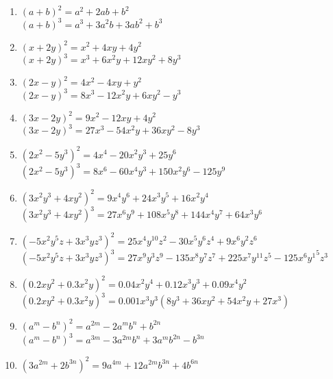 \begin{solution} \hfill \vspace{-0.5cm}
\begin{enumerate}
\item$(a+b)^2 = {{a}^{2}}+2ab+{{b}^{2}}$\\	$(a+b)^3 = {{a}^{3}}+3{{a}^{2}}b+3a{{b}^{2}}+{{b}^{3}}$
\item $(x+2y)^2 = {{x}^{2}}+4xy+4{{y}^{2}}$ \\	$(x+2y)^3 ={{x}^{3}}+6{{x}^{2}}y+12x{{y}^{2}}+8{{y}^{3}}$
\item $(2x-y)^2 = 4{{x}^{2}}-4xy+{{y}^{2}}$ \\	$(2x-y)^3 =8{{x}^{3}}-12x{}^{2}y+6x{{y}^{2}}-{{y}^{3}}$
\item $(3x-2y)^2 = 9{{x}^{2}}-12xy+4{{y}^{2}}$\\	$(3x-2y)^3 = 27{{x}^{3}}-54{{x}^{2}}y+36x{{y}^{2}}-8{{y}^{3}}$
\item $( 2{{x}^{2}}-5{{y}^{3}} ) ^2 = 4{{x}^{4}}-20{{x}^{2}}{{y}^{3}}+25{{y}^{6}}$\\	$( 2{{x}^{2}}-5{{y}^{3}} )^3 = 8{{x}^{6}}-60{{x}^{4}}{{y}^{3}}+150{{x}^{2}}{{y}^{6}}-125{{y}^{9}}$
\item $(3{{x}^{2}}{{y}^{3}}+4x{{y}^{2}})^2=9{{x}^{4}}{{y}^{6}}+24{{x}^{3}}{{y}^{5}}+16{{x}^{2}}{{y}^{4}}$\\
$(3{{x}^{2}}{{y}^{3}}+4x{{y}^{2}})^3=27{{x}^{6}}{{y}^{9}}+108{{x}^{5}}{{y}^{8}}+144{{x}^{4}}{{y}^{7}}+64{{x}^{3}}{{y}^{6}}$
\item $(-5{{x}^{2}}{{y}^{5}}z+3{{x}^{3}}y{{z}^{3}})^2=25{{x}^{4}}{{y}^{10}}{{z}^{2}}-30{{x}^{5}}{{y}^{6}}{{z}^{4}}+9{{x}^{6}}{{y}^{2}}{{z}^{6}}$\\					$(-5{{x}^{2}}{{y}^{5}}z+3{{x}^{3}}y{{z}^{3}})^3=27{{x}^{9}}{{y}^{3}}z{}^{9}-135{{x}^{8}}{{y}^{7}}{{z}^{7}}+225{{x}^{7}}{{y}^{11}}{{z}^{5}}-125{{x}^{6}}{{y}^{1}}^{5}{{z}^{3}}$
\item $(0.2x{{y}^{2}}+0.3{{x}^{2}}y)^2=0.04{{x}^{2}}{{y}^{4}}+0.12{{x}^{3}}{{y}^{3}}+0.09{{x}^{4}}{{y}^{2}}$\\
$(0.2x{{y}^{2}}+0.3{{x}^{2}}y)^3=0.001{{x}^{3}}{{y}^{3}}(8{{y}^{3}}+36x{{y}^{2}}+54{{x}^{2}}y+27{{x}^{3}})$
\item $({{a}^{m}}-{{b}^{n}})^2={{a}^{2m}}-2{{a}^{m}}{{b}^{n}}+{{b}^{2n}}$\\	$({{a}^{m}}-{{b}^{n}})^3={{a}^{3m}}-3{{a}^{2m}}{{b}^{n}}+3{{a}^{m}}{{b}^{2n}}-{{b}^{3n}}$
\item $(3{{a}^{2m}}+2{{b}^{3n}})^2=9{{a}^{4m}}+12{{a}^{2m}}{{b}^{3n}}+4{{b}^{6n}}$\\

\end{enumerate}
\end{solution}
